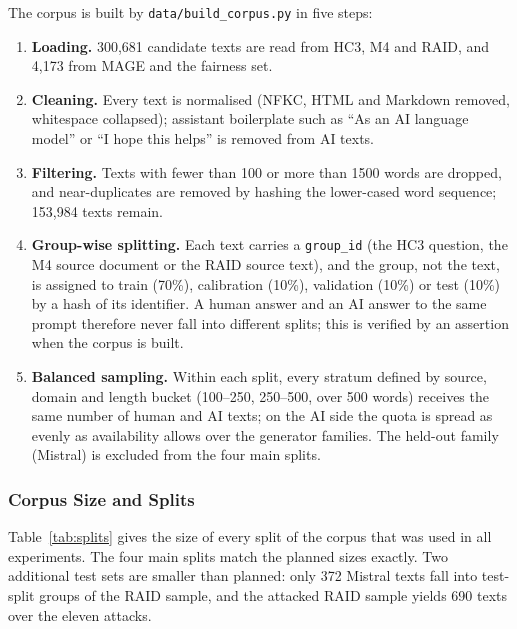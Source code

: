 The corpus is built by \texttt{data/build\_corpus.py} in five steps:
\begin{enumerate}
  \item \textbf{Loading.} 300,681 candidate texts are read from HC3, M4 and
        RAID, and 4,173 from MAGE and the fairness set.
  \item \textbf{Cleaning.} Every text is normalised (NFKC, HTML and Markdown
        removed, whitespace collapsed); assistant boilerplate such as
        ``As an AI language model'' or ``I hope this helps'' is removed from
        AI texts.
  \item \textbf{Filtering.} Texts with fewer than 100 or more than 1500 words
        are dropped, and near-duplicates are removed by hashing the
        lower-cased word sequence; 153,984 texts remain.
  \item \textbf{Group-wise splitting.} Each text carries a \texttt{group\_id}
        (the HC3 question, the M4 source document or the RAID source text),
        and the group, not the text, is assigned to train (70\%),
        calibration (10\%), validation (10\%) or test (10\%) by a hash of its
        identifier. A human answer and an AI answer to the same prompt
        therefore never fall into different splits; this is verified by an
        assertion when the corpus is built.
  \item \textbf{Balanced sampling.} Within each split, every stratum defined by
        source, domain and length bucket (100--250, 250--500, over 500 words)
        receives the same number of human and AI texts; on the AI side the
        quota is spread as evenly as availability allows over the generator
        families. The held-out family (Mistral) is excluded from the four main
        splits.
\end{enumerate}

\subsubsection{Corpus Size and Splits}

Table~\ref{tab:splits} gives the size of every split of the corpus that was
used in all experiments. The four main splits match the planned sizes exactly.
Two additional test sets are smaller than planned: only 372 Mistral texts
fall into test-split groups of the RAID sample, and the attacked RAID sample
yields 690 texts over the eleven attacks.

